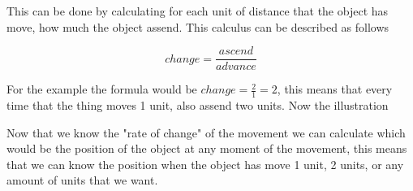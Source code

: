 \documentclass[12pt,journal]{IEEEtran}
\begin{document}
    This can be done by calculating for each unit of distance that the object
    has move, how much the object assend. This calculus can be  described as
    follows

    \begin{equation}
        change = \frac{ascend}{advance}
    \end{equation}

    \vspace{1cm}

    For the example the formula would be $change = \frac{2}{1} = 2$, this
    means that every time that the thing moves 1 unit, also assend two units.
    Now the illustration \\


    Now that we know the "rate of change" of the movement we can calculate which
    would be the position of the object at any moment of the movement, this
    means that we can know the position when the object has move 1 unit, 2
    units, or any amount of units that we want.
\end{document}
